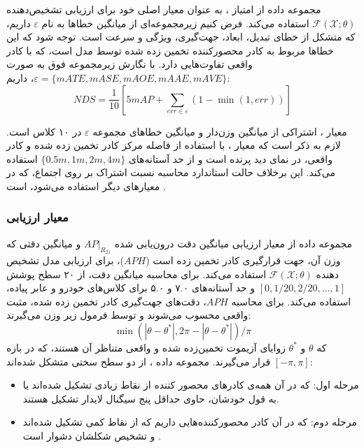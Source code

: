 مجموعه داده  از امتیاز ، به عنوان معیار اصلی خود برای ارزیابی تشخیص‌دهنده $\mathcal{F} (\mathcal{X} ; \theta)$ استفاده می‌کند. فرض کنیم زیرمجموعه‌ای از میانگین خطاها به نام $\varepsilon$ داریم، که متشکل از خطای تبدیل، ابعاد، جهت‌گیری، ویژگی و سرعت است. توجه شود که این خطاها مربوط به کادر محصورکننده تخمین زده شده توسط مدل است، که با کادر واقعی تفاوت‌هایی دارد. با نگارش زیرمجموعه فوق به صورت $\varepsilon = \{mATE, mASE, mAOE, mAAE, mAVE\}$، داریم: 
\begin{equation}
    NDS = \frac{1}{10}\left[5mAP + \sum_{err \in \varepsilon} (1 - \min(1, err)) \right]
\end{equation}

معیار ، اشتراکی از میانگین وزن‌دار  و  میانگین خطاهای مجموعه $\varepsilon$ در ۱۰ کلاس است. لازم به ذکر است که معیار ، با استفاده از فاصله مرکز کادر تخمین زده شده و کادر واقعی، در نمای دید پرنده است و از حد آستانه‌های $\{0.5m, 1m, 2m, 4m\}$ استفاده می‌کند. این برخلاف حالت استاندارد محاسبه ‌‌نسبت اشتراک بر روی اجتماع، که در معیارهای دیگر استفاده می‌شود، است \cite{qian20223d}.

\subsubsection{معیار ارزیابی }

مجموعه داده  از معیار ارزیابی میانگین دقت درون‌یابی شده $AP \vert_{R_{21}}$ و میانگین دقتی که وزن آن، جهت قرارگیری کادر تخمین زده است ($APH$)، برای ارزیابی مدل تشخیص دهنده $\mathcal{F} (\mathcal{X} ; \theta)$ استفاده می‌کند. برای محاسبه میانگین دقت،  از ۲۰ سطح پوشش $\left[0, 1/20, 2/20, \ldots, 1\right]$ و حد آستانه‌های ۷.۰ و ۵.۰ برای کلاس‌های خودرو و عابر پیاده، استفاده می‌کند. برای محاسبه $APH$، دقت‌های جهت‌گیری کادر تخمین زده ‌شده، مثبت واقعی محسوب می‌شوند و توسط فرمول زیر وزن می‌گیرند:
\begin{equation}
    \min(|\theta - \theta^*|, 2\pi - |\theta - \theta^*|)/\pi
\end{equation}
که $\theta$ و $\theta^*$ زوایای آزیموت تخمین‌زده شده و واقعی متناظر آن هستند، که در بازه‌ $[-\pi, \pi]$ قرار می‌گیرند. مجموعه داده ، از دو سطح سختی متشکل شده‌اند: 
\begin{itemize}
    \item مرحله اول: که در آن همه‌ی کادرهای محصور کننده از نقاط زیادی تشکیل شده‌اند یا به قول خودشان، حاوی حداقل پنج سیگنال لایدار تشکیل هستند.
    \item مرحله دوم: که در آن کادر محصورکننده‌هایی داریم که از نقاط کمی تشکیل شده‌اند و تشخیص شکلشان دشوار است \cite{qian20223d}.
\end{itemize}

